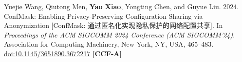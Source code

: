 Yuejie Wang, Qiutong Men, \textbf{Yao Xiao}, Yongting Chen, and Guyue Liu. 2024. ConfMask: Enabling Privacy-Preserving Configuration Sharing via Anonymization [ConfMask: 通过匿名化实现隐私保护的网络配置共享]. In \textit{Proceedings of the ACM SIGCOMM 2024 Conference (ACM SIGCOMM'24)}. Association for Computing Machinery, New York, NY, USA, 465--483. \href{https://doi.org/10.1145/3651890.3672217}{doi:10.1145/3651890.3672217} \textbf{[CCF-A]}
